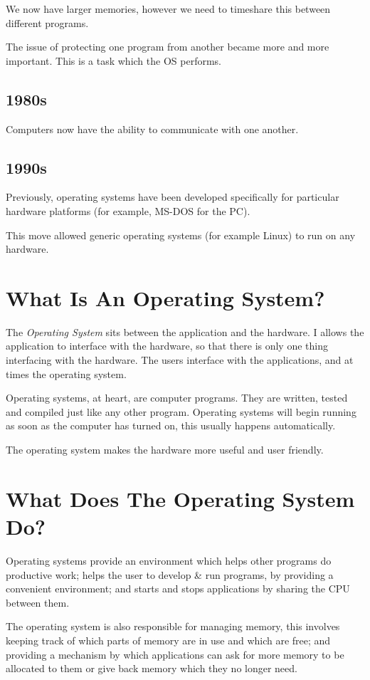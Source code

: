 We now have larger memories, however we need to timeshare this between different programs.

The issue of protecting one program from another became more and more important. This is a task which the OS performs. 

\subsection*{1980s}
Computers now have the ability to communicate with one another. 

\subsection*{1990s}
Previously, operating systems have been developed specifically for particular hardware platforms (for example, MS-DOS for the PC).

This move allowed generic operating systems (for example Linux) to run on any hardware. 

\section*{What Is An Operating System?}
The \textit{Operating System} sits between the application and the hardware. I allows the application to interface with the hardware, so that there is only one thing interfacing with the hardware. The users interface with the applications, and at times the operating system.

Operating systems, at heart, are computer programs. They are written, tested and compiled just like any other program. Operating systems will begin running as soon as the computer has turned on, this usually happens automatically. 

The operating system makes the hardware more useful and user friendly.

\section*{What Does The Operating System Do?}
Operating systems provide an environment which helps other programs do productive work; helps the user to develop \& run programs, by providing a convenient environment; and starts and stops applications by sharing the CPU between them.

The operating system is also responsible for managing memory, this involves keeping track of which parts of memory are in use and which are free; and providing a mechanism by which applications can ask for more memory to be allocated to them or give back memory which they no longer need.

